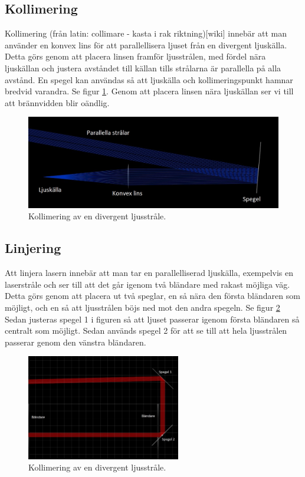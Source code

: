 \documentclass[a4paper]{article}
\begin{document}
\subsection{Kollimering}
Kollimering (från latin: collimare - kasta i rak riktning)[wiki] innebär att man använder en konvex lins
för att parallellisera ljuset från en divergent ljuskälla. Detta görs genom att placera linsen
framför ljusstrålen, med fördel nära ljuskällan och justera avståndet till källan tills strålarna är parallella
på alla avstånd. En spegel kan användas så att ljuskälla och kollimeringspunkt hamnar bredvid varandra. Se figur \ref{fig:kollimering}.
Genom att placera linsen nära ljuskällan ser vi till att brännvidden blir oändlig.
\begin{figure}[h]
    \includegraphics[width=\textwidth]{kollimera3.jpg}
    \caption{Kollimering av en divergent ljusstråle.}
    \label{fig:kollimering}
\end{figure}
\subsection{Linjering}
Att linjera lasern innebär att man tar en parallelliserad ljuskälla, exempelvis en laserstråle och ser till att det går igenom två bländare med rakast möjliga väg.
Detta görs genom att placera ut två speglar, en så nära den första bländaren som möjligt, och en så att ljusstrålen böjs ned mot den andra spegeln. Se figur \ref{fig:linjering}
Sedan justeras spegel 1 i figuren så att ljuset passerar igenom första bländaren så centralt som möjligt. Sedan används spegel 2 för att se till att hela ljusstrålen passerar
genom den vänstra bländaren.
\begin{figure}[h]
    \centering
    \includegraphics[width=0.6\textwidth]{linjera4.jpg}
    \caption{Kollimering av en divergent ljusstråle.}
    \label{fig:linjering}
\end{figure}
\pagebreak
\end{document}
